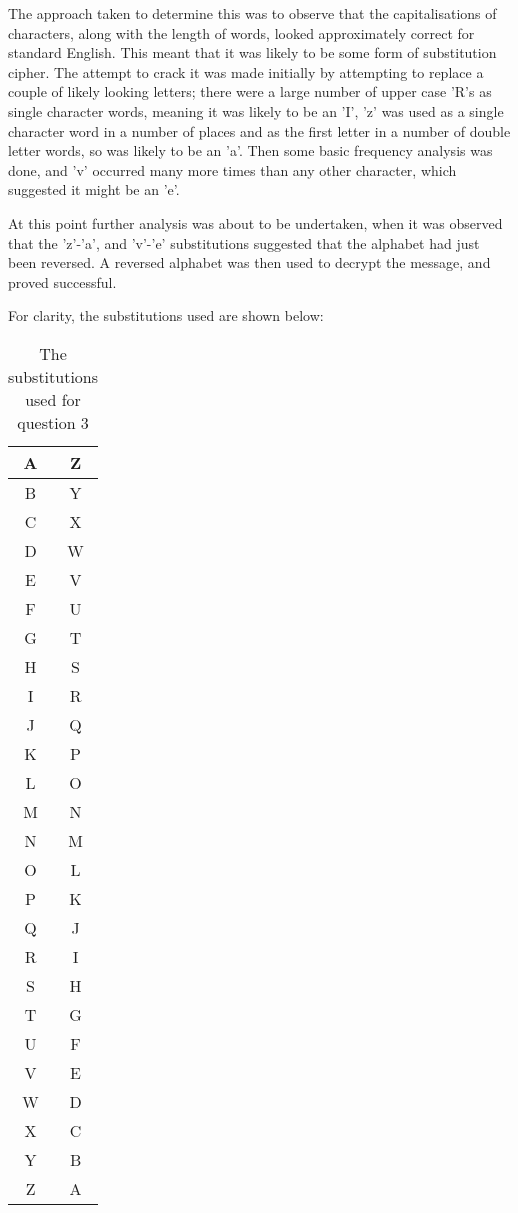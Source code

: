 The approach taken to determine this was to observe that the capitalisations of characters, along with the length of words, looked approximately correct for standard English.
This meant that it was likely to be some form of substitution cipher.
The attempt to crack it was made initially by attempting to replace a couple of likely looking letters; there were a large number of upper case 'R's as single character words, meaning it was likely to be an 'I', 'z' was used as a single character word in a number of places and as the first letter in a number of double letter words, so was likely to be an 'a'.
Then some basic frequency analysis was done, and 'v' occurred many more times than any other character, which suggested it might be an 'e'.

At this point further analysis was about to be undertaken, when it was observed that the 'z'-'a', and 'v'-'e' substitutions suggested that the alphabet had just been reversed.
A reversed alphabet was then used to decrypt the message, and proved successful.

For clarity, the substitutions used are shown below:

\begin{table}[h]
	\centering
	\begin{tabular}[h]{| c | c |}
		\hline
		A	& Z	\\ \hline
		B	& Y	\\ \hline
		C	& X	\\ \hline
		D	& W	\\ \hline
		E	& V	\\ \hline
		F	& U	\\ \hline
		G	& T	\\ \hline
		H	& S	\\ \hline
		I	& R	\\ \hline
		J	& Q	\\ \hline
		K	& P	\\ \hline
		L	& O	\\ \hline
		M	& N	\\ \hline
		N	& M	\\ \hline
		O	& L	\\ \hline
		P	& K	\\ \hline
		Q	& J	\\ \hline
		R	& I	\\ \hline
		S	& H	\\ \hline
		T	& G	\\ \hline
		U	& F	\\ \hline
		V	& E	\\ \hline
		W	& D	\\ \hline
		X	& C	\\ \hline
		Y	& B	\\ \hline
		Z	& A	\\ \hline
	\end{tabular}
	\caption{The substitutions used for question 3}
	\label{tab:sub3}
\end{table}
